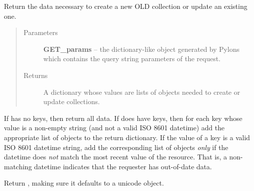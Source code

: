 \documentclass[letterpaper,10pt,english]{sphinxmanual}
\begin{document}
\begin{fulllineitems}
\label{api:onlinelinguisticdatabase.controllers.oldcollections.getNewEditCollectionData}
Return the data necessary to create a new OLD collection or update an existing one.
\begin{quote}\begin{description}
\item[{Parameters}] \leavevmode
\textbf{GET\_params} -- the  dictionary-like object generated by
Pylons which contains the query string parameters of the request.

\item[{Returns}] \leavevmode
A dictionary whose values are lists of objects needed to create or
update collections.

\end{description}\end{quote}

If  has no keys, then return all data.  If  does
have keys, then for each key whose value is a non-empty string (and not a
valid ISO 8601 datetime) add the appropriate list of objects to the return
dictionary.  If the value of a key is a valid ISO 8601 datetime string, add
the corresponding list of objects \emph{only} if the datetime does \emph{not} match
the most recent  value of the resource.  That is, a
non-matching datetime indicates that the requester has out-of-date data.

\end{fulllineitems}


\begin{fulllineitems}
\label{api:onlinelinguisticdatabase.controllers.oldcollections.getUnicode}
Return , making sure it defaults to a unicode object.

\end{fulllineitems}

\end{document}
